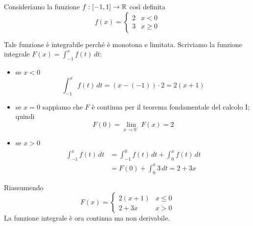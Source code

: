 \begin{example}
Consideriamo la funzione $f: [-1,1] \to \mathbb R$ così definita
\begin{equation*}
f(x) = \begin{cases}
2 & x < 0 \\
3 & x \ge 0
\end{cases}
\end{equation*}

Tale funzione è integrabile perché è monotona e limitata. Scriviamo la funzione integrale $F(x) = \int_{-1}^x f(t) \, dt$:
\begin{itemize}
\item se $x < 0$
\begin{equation*}
\int_{-1}^x f(t) \, dt = (x-(-1)) \cdot 2 = 2(x+1)
\end{equation*}
\item se $x = 0$ sappiamo che $F$ è continua per il teorema fondamentale del calcolo I; quindi
\begin{equation*}
F(0) = \lim_{x \to 0^-} F(x) = 2
\end{equation*}
\item se $x > 0$
\begin{align*}
\int_{-1}^x f(t) \, dt &= \int_{-1}^0 f(t) \, dt + \int_0^x f(t) \, dt \\
&= F(0) + \int_0^x 3 \, dt = 2 + 3x
\end{align*}
\end{itemize}

Riassumendo
\begin{equation*}
F(x) = \begin{cases}
2(x+1) & x \le 0 \\
2+3x & x > 0
\end{cases}
\end{equation*}
La funzione integrale è ora continua ma non derivabile.
\end{example}
